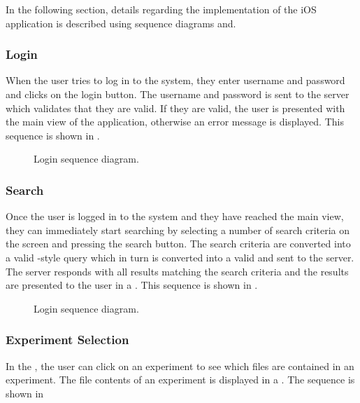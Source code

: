 In the following section, details regarding the implementation of the iOS application is described using sequence diagrams and.

\subsubsection{Login}

When the user tries to log in to the system, they enter username and password and clicks on the login button. The username and password is sent to the server which validates that they are valid. If they are valid, the user is presented with the main view of the application, otherwise an error message is displayed. This sequence is shown in  .

\begin{figure}[ht]
\caption{Login sequence diagram.}
\label{fig:ios_sequence_login}
\end{figure}

\subsubsection{Search}

Once the user is logged in to the system and they have reached the main view, they can immediately start searching by selecting a number of search criteria on the screen and pressing the search button. The search criteria are converted into a valid -style query which in turn is converted into a valid  and sent to the server. The server responds with all results matching the search criteria and the results are presented to the user in a . This sequence is shown in .

\begin{figure}[ht]
\caption{Login sequence diagram.}
\label{fig:ios_sequence_search}
\end{figure}

\subsubsection{Experiment Selection}

In the , the user can click on an experiment to see which files are contained in an experiment. The file contents of an experiment is displayed in a . The sequence is shown in  

